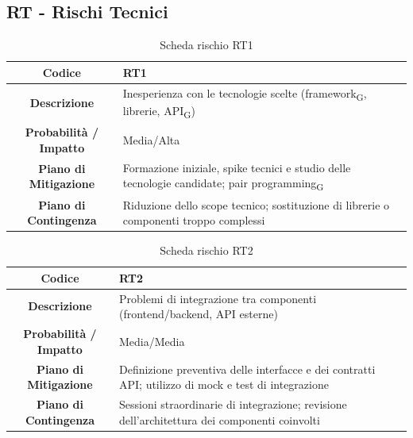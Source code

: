 \subsection{RT - Rischi Tecnici}
\begin{table}[H]
	\centering
	\renewcommand{\arraystretch}{1.3}
	\begin{tabularx}{\textwidth}{|c|X|}
		\hline
		\textbf{Codice} & \textbf{RT1} \\
		\hline
		\textbf{Descrizione} & Inesperienza con le tecnologie scelte (framework\textsubscript{G}, librerie, API\textsubscript{G}) \\
		\hline
		\textbf{Probabilità / Impatto} & Media/Alta \\
		\hline
		\textbf{Piano di Mitigazione} & Formazione iniziale, spike tecnici e studio delle tecnologie candidate; pair programming\textsubscript{G} \\
		\hline
		\textbf{Piano di Contingenza} & Riduzione dello scope tecnico; sostituzione di librerie o componenti troppo complessi \\
		\hline
	\end{tabularx}
	\caption{Scheda rischio RT1}
\end{table}

\begin{table}[H]
	\centering
	\renewcommand{\arraystretch}{1.3}
	\begin{tabularx}{\textwidth}{|c|X|}
		\hline
		\textbf{Codice} & \textbf{RT2} \\
		\hline
		\textbf{Descrizione} & Problemi di integrazione tra componenti (frontend/backend, API esterne) \\
		\hline
		\textbf{Probabilità / Impatto} & Media/Media \\
		\hline
		\textbf{Piano di Mitigazione} & Definizione preventiva delle interfacce e dei contratti API; utilizzo di mock e test di integrazione \\
		\hline
		\textbf{Piano di Contingenza} & Sessioni straordinarie di integrazione; revisione dell'architettura dei componenti coinvolti \\
		\hline
	\end{tabularx}
	\caption{Scheda rischio RT2}
\end{table}

